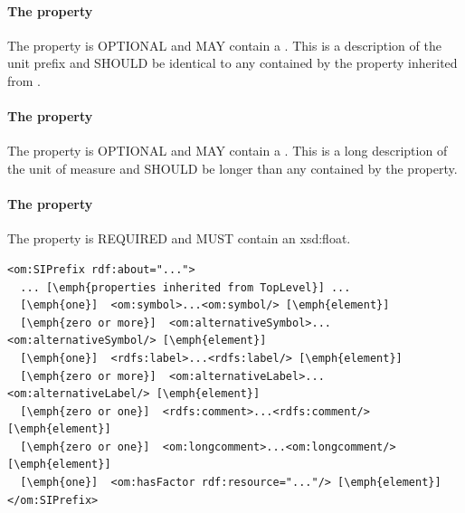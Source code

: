 {\paragraph{The  property}\label{sec:comment:Prefix}
The  property is OPTIONAL and MAY contain a . This  is a description of the unit prefix and SHOULD be identical to any  contained by the  property inherited from .

\paragraph{The  property}\label{sec:longcomment:Prefix}
The  property is OPTIONAL and MAY contain a . This  is a long description of the unit of measure and SHOULD be longer than any  contained by the  property.

\paragraph{The  property}\label{sec:hasFactor:Prefix}
The  property is REQUIRED and MUST contain an xsd:float.
}


\begin{lstlisting}
<om:SIPrefix rdf:about="...">
  ... [\emph{properties inherited from TopLevel}] ...
  [\emph{one}]  <om:symbol>...<om:symbol/> [\emph{element}]
  [\emph{zero or more}]  <om:alternativeSymbol>...<om:alternativeSymbol/> [\emph{element}]
  [\emph{one}]  <rdfs:label>...<rdfs:label/> [\emph{element}]
  [\emph{zero or more}]  <om:alternativeLabel>...<om:alternativeLabel/> [\emph{element}]
  [\emph{zero or one}]  <rdfs:comment>...<rdfs:comment/> [\emph{element}]
  [\emph{zero or one}]  <om:longcomment>...<om:longcomment/> [\emph{element}]
  [\emph{one}]  <om:hasFactor rdf:resource="..."/> [\emph{element}]
</om:SIPrefix>
\end{lstlisting}

